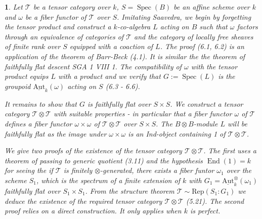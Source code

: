 \documentclass{article}
\newtheorem{env}[term]{}
\DeclareMathOperator{\spec}{\text{Spec}}
\DeclareMathOperator{\End}{\text{End}}
\begin{document}
  \begin{env}
    Let $\mathcal T$ be a tensor category over $k$, $S = \spec (B)$ be an affine scheme over $k$ and $\omega$ be 
    a fiber functor of $\mathcal T$ over $S$. Imitating Saavedra, we begin by forgetting the tensor product and 
    construct a $k$-co-algebra $L$ acting on $B$ such that $\omega$ factors through an equivalence of categories 
    of $\mathcal T$ and the category of locally free sheaves of finite rank over $S$ equipped with a coaction of $L$.
    The proof (6.1, 6.2) is an application of the theorem of Barr-Beck (4.1). It is similar the the theorem of 
    faithfully flat descent SGA 1 VIII 1. The compatibility of $\omega$ with the tensor product equips $L$ with a 
    product and we verify that $G:=\spec (L)$ is the groupoid $\underline {\text{Aut}}_k (\omega)$ acting 
    on $S$ (6.3 - 6.6).

    It remains to show that $G$ is faithfully flat over $S \times S$. We construct a tensor category 
    $\mathcal T \otimes \mathcal T$ with suitable properties - in particular that a fiber functor $\omega$ of 
    $\mathcal T$ defines a fiber functor $\omega \times \omega$ of $\mathcal T \otimes \mathcal T$ over $S \times S$. 
    The $B \otimes B$-module $L$ will be faithfully flat as the image under $\omega \times \omega$ is an Ind-object 
    containing 1 of $\mathcal T \otimes \mathcal T$.

    We give two proofs of the existence of the tensor category $\mathcal T \otimes \mathcal T$. The first uses a 
    theorem of passing to generic quotient (3.11) and the hypothesis $\End (1) = k$ for seeing the if 
    $\mathcal T$ is finitely $\otimes$-generated, there exists a fiber funtor $\omega_1$ over the scheme $S_1$, 
    which is the spectrum of a finite extension of $k$ with $G_1 = \underline{\text{Aut}}_k ^\otimes (\omega_1)$ 
    faithfully flat over $S_1 \times S_1$. From the structure theorem $\mathcal T \sim \text{Rep} (S_1 : G_1)$ we 
    deduce the existence of the required tensor category $\mathcal T \otimes \mathcal T$ (5.21). The second 
    proof relies on a direct construction. It only applies when $k$ is perfect.
  \end{env}
\end{document}
